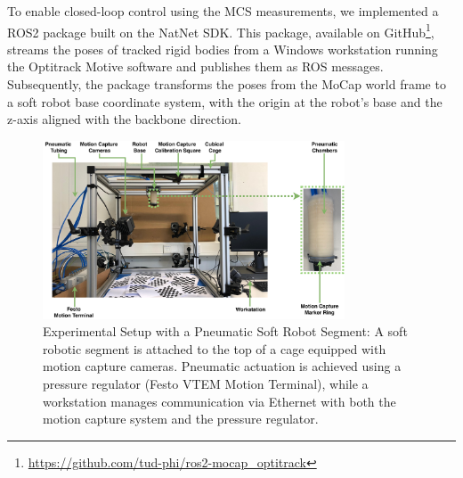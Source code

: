 To enable closed-loop control using the \gls{MCS} measurements, we implemented a ROS2 package built on the NatNet SDK. This package, available on GitHub\footnote{\url{https://github.com/tud-phi/ros2-mocap_optitrack}}, streams the poses of tracked rigid bodies from a Windows workstation running the Optitrack Motive software and publishes them as ROS messages. Subsequently, the package transforms the poses from the MoCap world frame to a soft robot base coordinate system, with the origin at the robot’s base and the z-axis aligned with the backbone direction.

\begin{figure}[ht]
     \centering
     \includegraphics[width=0.8\textwidth]{appendix-infrastructure/figures/graphic_experimental_setup.drawio_v1.drawio_compressed.pdf}
     \caption{
     Experimental Setup with a Pneumatic Soft Robot Segment: A soft robotic segment is attached to the top of a cage equipped with motion capture cameras. Pneumatic actuation is achieved using a pressure regulator (Festo VTEM Motion Terminal), while a workstation manages communication via Ethernet with both the motion capture system and the pressure regulator.
     }
     \label{fig:apx:infrastructure:experimental_setup}
\end{figure}

